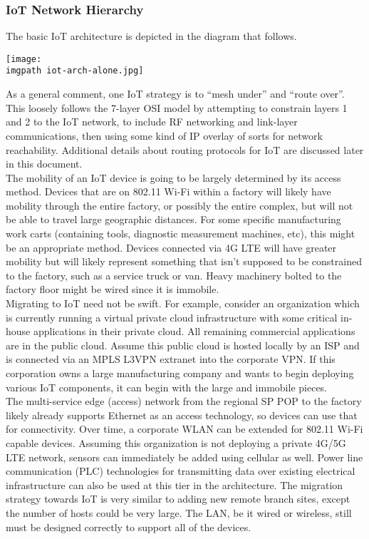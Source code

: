 \subsubsection{IoT Network Hierarchy}
The basic IoT architecture is depicted in the diagram that follows.

    \begin{minipage}[t]{\linewidth}
	  \centering
      \texttt{[image: \\imgpath iot-arch-alone.jpg]}
    \end{minipage}

As a general comment, one IoT strategy is to ``mesh under'' and ``route
over''. This loosely follows the 7-layer OSI model by attempting to constrain
layers 1 and 2 to the IoT network, to include RF networking and link-layer
communications, then using some kind of IP overlay of sorts for network
reachability. Additional details about routing protocols for IoT are discussed
later in this document. \\

The mobility of an IoT device is going to be largely determined by its access
method. Devices that are on 802.11 Wi-Fi within a factory will likely have
mobility through the entire factory, or possibly the entire complex, but will
not be able to travel large geographic distances. For some specific
manufacturing work carts (containing tools, diagnostic measurement machines,
etc), this might be an appropriate method. Devices connected via 4G LTE will
have greater mobility but will likely represent something that isn’t supposed
to be constrained to the factory, such as a service truck or van. Heavy
machinery bolted to the factory floor might be wired since it is immobile. \\

Migrating to IoT need not be swift. For example, consider an organization
which is currently running a virtual private cloud infrastructure with some
critical in-house applications in their private cloud. All remaining
commercial applications are in the public cloud. Assume this public cloud is
hosted locally by an ISP and is connected via an MPLS L3VPN extranet into the
corporate VPN\@. If this corporation owns a large manufacturing company and
wants to begin deploying various IoT components, it can begin with the large
and immobile pieces. \\

The multi-service edge (access) network from the regional SP POP to the
factory likely already supports Ethernet as an access technology, so devices
can use that for connectivity. Over time, a corporate WLAN can be extended for
802.11 Wi-Fi capable devices. Assuming this organization is not deploying a
private 4G/5G LTE network, sensors can immediately be added using cellular as
well. Power line communication (PLC) technologies for transmitting data over
existing electrical infrastructure can also be used at this tier in the
architecture. The migration strategy towards IoT is very similar to adding new
remote branch sites, except the number of hosts could be very large. The LAN,
be it wired or wireless, still must be designed correctly to support all of
the devices. \\

